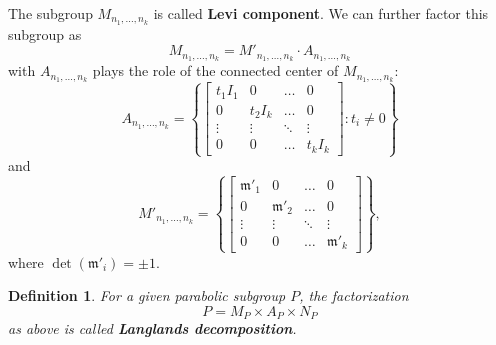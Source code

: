 \documentclass[12pt]{article} %
\newtheorem{definition}{Definition}[section]
\begin{document}
The subgroup $M_{n_1,\ldots, n_k}$ is called \textbf{Levi component}. We can further factor this subgroup as
\[M_{n_1,\ldots, n_k} = M'_{n_1,\ldots, n_k} \cdot A_{n_1,\ldots, n_k}\]
with $A_{n_1,\ldots, n_k}$ plays the role of the connected center of $M_{n_1,\ldots, n_k}$:
\[A_{n_1,\ldots, n_k} = \left\lbrace \begin{bmatrix}
        t_1I_1 & 0      & \ldots & 0      \\
        0      & t_2I_k & \ldots & 0      \\
        \vdots & \vdots & \ddots & \vdots \\
        0      & 0      & \ldots & t_kI_k
    \end{bmatrix} : t_i \ne 0\right\rbrace \]
and
\[M'_{n_1,\ldots, n_k} = \left\lbrace \begin{bmatrix}
        \mathfrak{m}'_1 & 0               & \ldots & 0               \\
        0               & \mathfrak{m}'_2 & \ldots & 0               \\
        \vdots          & \vdots          & \ddots & \vdots          \\
        0               & 0               & \ldots & \mathfrak{m}'_k
    \end{bmatrix} \right\rbrace,\]
where $\det(\mathfrak{m}'_i) = \pm 1$. 
\begin{definition}
    For a given parabolic subgroup $P$, the factorization 
    \[P = M_P \times A_P \times N_P\]
    as above is called \textbf{Langlands decomposition}. 
\end{definition}
\end{document}
